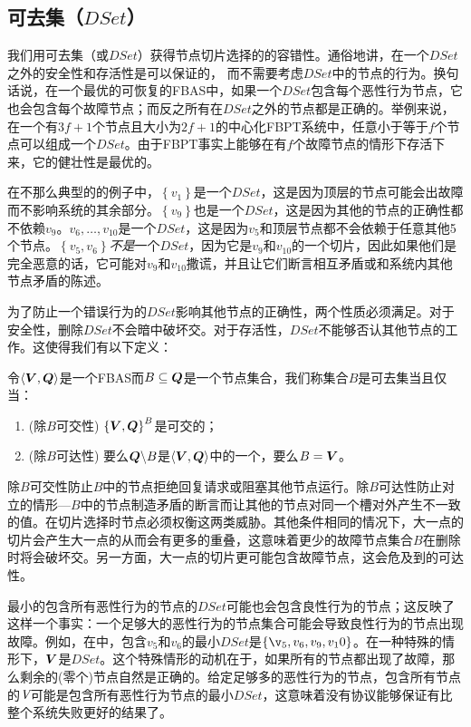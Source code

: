 \subsection{可去集（$DSet$）}
我们用可去集（或$DSet$）获得节点切片选择的的容错性。通俗地讲，在一个$DSet$之外的安全性和存活性是可以保证的，	而不需要考虑$DSet$中的节点的行为。换句话说，在一个最优的可恢复的FBAS中，如果一个$DSet$包含每个恶性行为节点，它也会包含每个故障节点；而反之所有在$DSet$之外的节点都是正确的。举例来说，在一个有$3f+1$个节点且{\quorum}大小为$2f+1$的中心化FBPT系统中，任意小于等于$f$个节点可以组成一个$DSet$。由于FBPT事实上能够在有$f$个故障节点的情形下存活下来，它的健壮性是最优的。

在不那么典型的的例子中，$\left\{v_1\right\}$是一个$DSet$，这是因为顶层的节点可能会出故障而不影响系统的其余部分。$\left\{v_9\right\}$也是一个$DSet$，这是因为其他的节点的正确性都不依赖$v_9$。$v_6,\ldots,v_10$是一个$DSet$，这是因为$v_5$和顶层节点都不会依赖于任意其他5个节点。$\left\{v_5,v_6\right\}$\textit{不是}一个$DSet$，因为它是$v_9$和$v_10$的一个切片，因此如果他们是完全恶意的话，它可能对$v_9$和$v_10$撒谎，并且让它们断言相互矛盾或和系统内其他节点矛盾的陈述。

为了防止一个错误行为的$DSet$影响其他节点的正确性，两个性质必须满足。对于安全性，删除$DSet$不会暗中破坏{\quorum}交。对于存活性，$DSet$不能够否认其他节点的工作{\quorum}。这使得我们有以下定义：

\begin{definition}[DSet]
	令$\langle{\bm V},{\bm Q}\rangle$是一个FBAS而$B\subseteq {\bm Q}$是一个节点集合，我们称集合$B$是可去集当且仅当：
	\begin{enumerate}
		\item (除$B${\quorum}可交性) $\left\{{\bm V},{\bm Q}\right\}^{B}$是{\quorum}可交的；
		\item (除$B${\quorum}可达性) 要么${\bm Q}\backslash B$是$\langle{\bm V},{\bm Q}\rangle$中的一个{\quorum}，要么$B={\bm V}$。
	\end{enumerate}
\end{definition}

除$B${\quorum}可交性防止$B$中的节点拒绝回复请求或阻塞其他节点运行。除$B${\quorum}可达性防止对立的情形---$B$中的节点制造矛盾的断言而让其他的节点对同一个槽对外产生不一致的值。在切片选择时节点必须权衡这两类威胁。其他条件相同的情况下，大一点的切片会产生大一点的{\quorum}从而会有更多的重叠，这意味着更少的故障节点集合$B$在删除时将会破坏{\quorum}交。另一方面，大一点的切片更可能包含故障节点，这会危及到{\quorum}的可达性。

最小的包含所有恶性行为的节点的$DSet$可能也会包含良性行为的节点；这反映了这样一个事实：一个足够大的恶性行为的节点集合可能会导致良性行为的节点出现故障。例如，在中，包含$v_5$和$v_6$的最小$DSet$是$\left\{\v_5,v_6,v_9,v_10\right\}$。在一种特殊的情形下，${\bm V}$是$DSet$。这个特殊情形的动机在于，如果所有的节点都出现了故障，那么剩余的(零个)节点自然是正确的。给定足够多的恶性行为的节点，包含所有节点的$\emph{V}$可能是包含所有恶性行为节点的最小$DSet$，这意味着没有协议能够保证有比整个系统失败更好的结果了。

